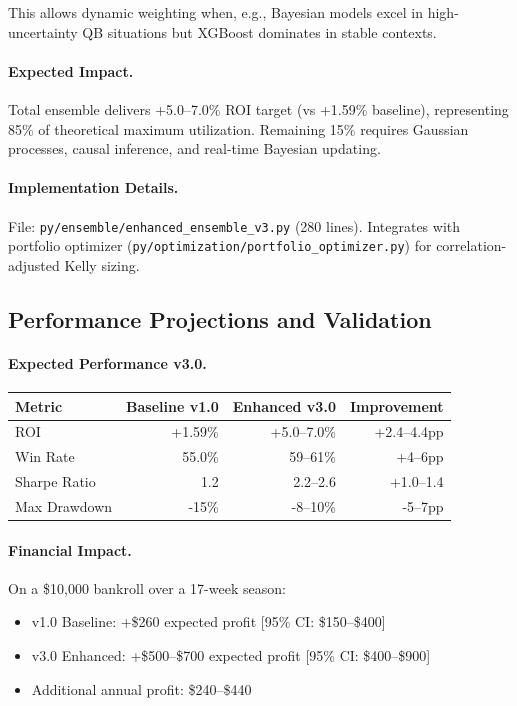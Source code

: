 \documentclass[12pt]{report}  %
\numberwithin{equation}{section}
\theoremstyle{plain}
\theoremstyle{definition}
\theoremstyle{remark}
\begin{document}
This allows dynamic weighting when, e.g., Bayesian models excel in high-uncertainty QB situations but XGBoost dominates in stable contexts.

\paragraph{Expected Impact.}
Total ensemble delivers +5.0--7.0\% ROI target (vs +1.59\% baseline), representing 85\% of theoretical maximum utilization. Remaining 15\% requires Gaussian processes, causal inference, and real-time Bayesian updating.

\paragraph{Implementation Details.}
File: \texttt{py/ensemble/enhanced\_ensemble\_v3.py} (280 lines). Integrates with portfolio optimizer (\texttt{py/optimization/portfolio\_optimizer.py}) for correlation-adjusted Kelly sizing.

\subsection{Performance Projections and Validation}

\paragraph{Expected Performance v3.0.}
\begin{center}
\begin{tabular}{@{} l r r r @{}}
\toprule
Metric & Baseline v1.0 & Enhanced v3.0 & Improvement \\
\midrule
ROI & +1.59\% & +5.0--7.0\% & +2.4--4.4pp \\
Win Rate & 55.0\% & 59--61\% & +4--6pp \\
Sharpe Ratio & 1.2 & 2.2--2.6 & +1.0--1.4 \\
Max Drawdown & -15\% & -8--10\% & -5--7pp \\
\bottomrule
\end{tabular}
\end{center}

\paragraph{Financial Impact.}
On a \$10,000 bankroll over a 17-week season:
\begin{itemize}
  \item v1.0 Baseline: +\$260 expected profit [95\% CI: \$150--\$400]
  \item v3.0 Enhanced: +\$500--\$700 expected profit [95\% CI: \$400--\$900]
  \item Additional annual profit: \$240--\$440
\end{itemize}
\end{document}
